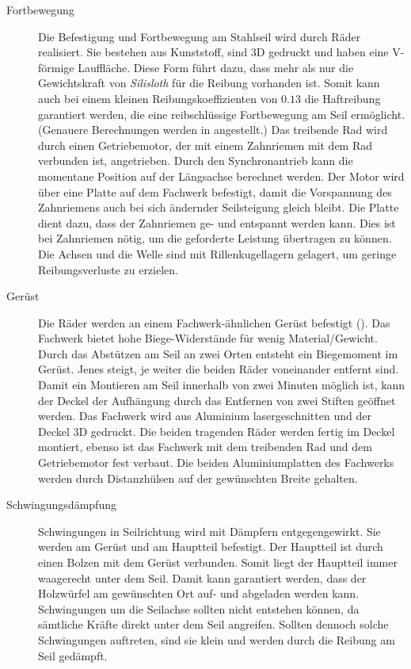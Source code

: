 \begin{description}
\item[Fortbewegung] Die Befestigung und Fortbewegung am Stahlseil wird durch Räder realisiert. Sie bestehen aus Kunststoff, sind 3D gedruckt und haben eine V-förmige Lauffläche. Diese Form führt dazu, dass mehr als nur die Gewichtskraft von \textit{Silisloth} für die Reibung vorhanden ist. Somit kann auch bei einem kleinen Reibungskoeffizienten von $0.13$ die Haftreibung garantiert werden, die eine reibschlüssige Fortbewegung am Seil ermöglicht. (Genauere Berechnungen werden in  angestellt.) Das treibende Rad wird durch einen Getriebemotor, der mit einem Zahnriemen mit dem Rad verbunden ist, angetrieben. Durch den Synchronantrieb kann die momentane Position auf der Längsachse berechnet werden. Der Motor wird über eine Platte auf dem Fachwerk befestigt, damit die Vorspannung des Zahnriemens auch bei sich ändernder Seilsteigung gleich bleibt. Die Platte dient dazu, dass der Zahnriemen ge- und entspannt werden kann. Dies ist bei Zahnriemen nötig, um die geforderte Leistung übertragen zu können. Die Achsen und die Welle sind mit Rillenkugellagern gelagert, um geringe Reibungsverluste zu erzielen.
\item[Gerüst] Die Räder werden an einem Fachwerk-ähnlichen Gerüst befestigt (). Das Fachwerk bietet hohe Biege-Widerstände für wenig Material/Gewicht. Durch das Abstützen am Seil an zwei Orten entsteht ein Biegemoment im Gerüst. Jenes steigt, je weiter die beiden Räder voneinander entfernt sind.
Damit ein Montieren am Seil innerhalb von zwei Minuten möglich ist, kann der Deckel der Aufhängung durch das Entfernen von zwei Stiften geöffnet werden. Das Fachwerk wird aus Aluminium lasergeschnitten und der Deckel 3D gedruckt. Die beiden tragenden Räder werden fertig im Deckel montiert, ebenso ist das Fachwerk mit dem treibenden Rad und dem Getriebemotor fest verbaut. Die beiden Aluminiumplatten des Fachwerks werden durch Distanzhülsen auf der gewünschten Breite gehalten.
\item[Schwingungsdämpfung] Schwingungen in Seilrichtung wird mit Dämpfern entgegengewirkt. Sie werden am Gerüst und am Hauptteil befestigt. Der Hauptteil ist durch einen Bolzen mit dem Gerüst verbunden. Somit liegt der Hauptteil immer waagerecht unter dem Seil. Damit kann garantiert werden, dass der Holzwürfel am gewünschten Ort auf- und abgeladen werden kann. Schwingungen um die Seilachse sollten nicht entstehen können, da sämtliche Kräfte direkt unter dem Seil angreifen. Sollten dennoch solche Schwingungen auftreten, sind sie klein und werden durch die Reibung am Seil gedämpft.
\end{description}

